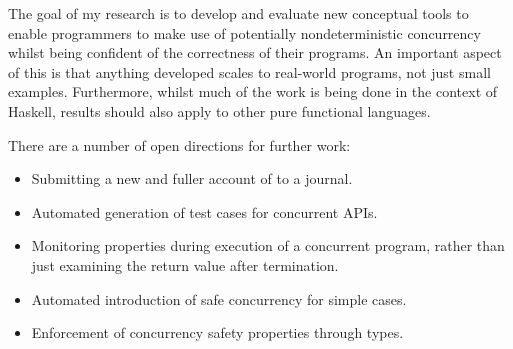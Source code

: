 The goal of my research is to develop and evaluate new conceptual
tools to enable programmers to make use of potentially
nondeterministic concurrency whilst being confident of the correctness
of their programs. An important aspect of this is that anything
developed scales to real-world programs, not just small
examples. Furthermore, whilst much of the work is being done in the
context of Haskell, results should also apply to other pure functional
languages.

There are a number of open directions for further work:

\begin{itemize}
\item Submitting a new and fuller account of \dejafu{} to a journal.

\item Automated generation of test cases for concurrent APIs.

\item Monitoring properties during execution of a concurrent program,
  rather than just examining the return value after termination.

\item Automated introduction of safe concurrency for simple cases.

\item Enforcement of concurrency safety properties through types.
\end{itemize}
